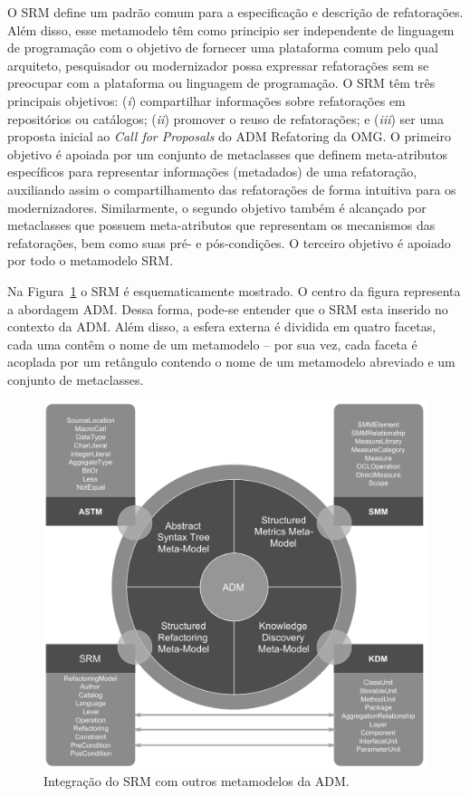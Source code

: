 O SRM define um padrão comum para a especificação e descrição de refatorações. Além disso, esse metamodelo têm como principio ser independente de linguagem de programação com o objetivo de fornecer uma plataforma comum pelo qual arquiteto, pesquisador ou modernizador possa expressar refatorações sem se preocupar com a plataforma ou linguagem de programação. O SRM têm três principais objetivos: (\textit{i}) compartilhar informações sobre refatorações em repositórios ou catálogos; (\textit{ii}) promover o reuso de refatorações; e (\textit{iii}) ser uma proposta inicial ao \textit{Call for Proposals} do ADM Refatoring da OMG. O primeiro objetivo é apoiada por um conjunto de metaclasses que definem meta-atributos específicos para representar informações (metadados) de uma refatoração, auxiliando assim o compartilhamento das refatorações de forma intuitiva para os modernizadores. Similarmente, o segundo objetivo também é alcançado por metaclasses que possuem meta-atributos que representam os mecanismos das refatorações, bem como suas pré- e pós-condições. O terceiro objetivo é apoiado por todo o metamodelo SRM.
 

Na Figura~\ref{fig:refactoring_metamodel} o SRM é esquematicamente mostrado. O centro da figura representa a abordagem ADM. Dessa forma, pode-se entender que o SRM esta inserido no contexto da ADM. Além disso, a esfera externa é dividida em quatro facetas, cada uma contêm o nome de um metamodelo – por sua vez, cada faceta é acoplada por um retângulo contendo o nome de um metamodelo abreviado e um conjunto de metaclasses. 

\begin{figure}[h]
	\centering
	\caption{Integração do SRM com outros metamodelos da ADM.}
	\label{fig:refactoring_metamodel}
	\includegraphics[scale=0.65]{images/SRM2Formatted}
	\fautor
\end{figure}

